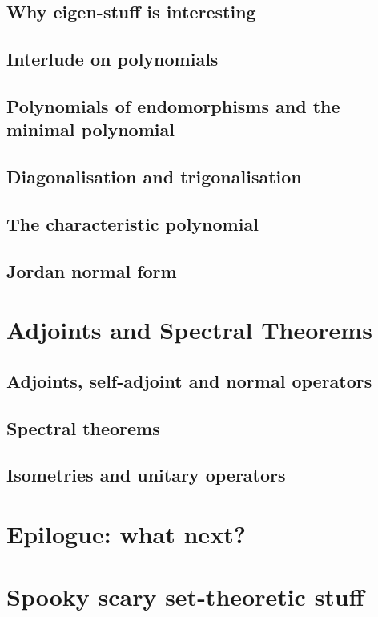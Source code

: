 \documentclass{book}
\theoremstyle{plain}
\theoremstyle{definition}
\theoremstyle{remark}
\begin{document}
\section{Why eigen-stuff is interesting}

\section{Interlude on polynomials}

\section{Polynomials of endomorphisms and the minimal polynomial}

\section{Diagonalisation and trigonalisation}

\section{The characteristic polynomial}

\section{Jordan normal form}

\chapter{Adjoints and Spectral Theorems}

\section{Adjoints, self-adjoint and normal operators}

\section{Spectral theorems}

\section{Isometries and unitary operators}

\chapter*{Epilogue: what next?}

\appendix

\chapter{Spooky scary set-theoretic stuff}
\end{document}
